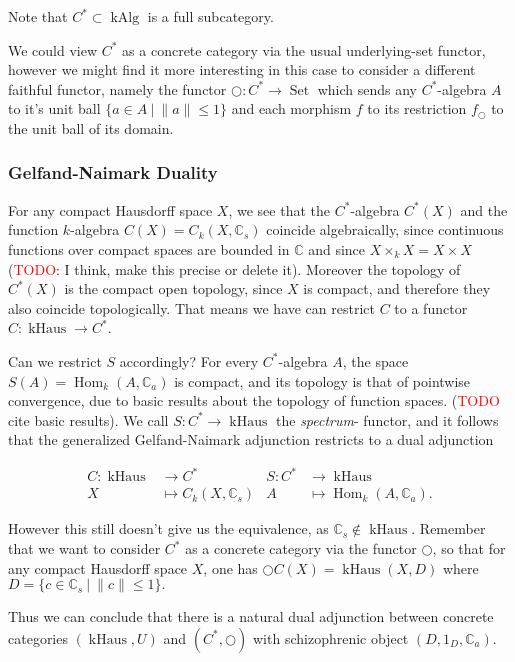 \documentclass[12pt,a4paper]{article}
\DeclareMathOperator{\Hom}{Hom}
\DeclareMathOperator{\Set}{Set}
\DeclareMathOperator{\kHaus}{kHaus}
\DeclareMathOperator{\kAlg}{kAlg}
\begin{document}
Note that $C^* \subset \kAlg$ is a full subcategory.

 We could view $C^*$ as a concrete category via the usual underlying-set functor, however we might find it more interesting in this case to consider a different faithful functor, namely the functor $\bigcirc: C^* \to \Set$ which sends any $C^*$-algebra $A$ to it's unit ball $\{ a \in A \  \lvert  \ \lVert a \lVert \leq 1\}$ and each morphism $f$  to its restriction $f_\bigcirc$ to the unit ball of its domain.
 
 \subsubsection{Gelfand-Naimark Duality}
 
 For any compact Hausdorff space $X$, we see that the $C^*$-algebra $C^*(X)$ and the function $k$-algebra $C(X) = C_k(X, \mathbb{C}_s)$ coincide algebraically, since continuous functions over compact spaces are bounded in $\mathbb{C}$ and since $X \times_k X = X \times X$ (\textcolor{red}{TODO}: I think, make this precise or delete it). Moreover the topology of $C^*(X)$ is the compact open topology, since $X$ is compact, and therefore they also coincide topologically. That means we have can restrict $C$ to a functor $C: \kHaus \to C^*$.
 
 Can we restrict $S$ accordingly? For every $C^*$-algebra $A$, the space $S(A) = \Hom_k(A, \mathbb{C}_a)$ is compact, and its topology is that of pointwise convergence, due to basic results about the topology of function spaces. (\textcolor{red}{TODO} cite basic results). We call $S: C^* \to \kHaus$ the \emph{spectrum}- functor, and it follows that the generalized Gelfand-Naimark adjunction restricts to a dual adjunction
 
 \begin{align*}
	C: \kHaus & \to C^* &  S: C^* & \to \kHaus\\
	X &\mapsto C_k(X, \mathbb{C}_s) & A &\mapsto \Hom_k(A, \mathbb{C}_a).
\end{align*}
 
 However this still doesn't give us the equivalence, as $\mathbb{C}_s \notin \kHaus$. Remember that we want to consider $C^*$ as a concrete category via the functor $\bigcirc$, so that for any compact Hausdorff space $X$, one has $\bigcirc C(X) = \kHaus(X, D)$ where $D = \{ c \in \mathbb{C}_s \ \lvert \ \lVert c \lVert \leq 1 \}. $
 
 Thus we can conclude that there is a natural dual adjunction between concrete categories $(\kHaus, U)$ and $(C^*, \bigcirc)$ with schizophrenic object $(D, 1_D, \mathbb{C}_a)$. 
 
\end{document}

